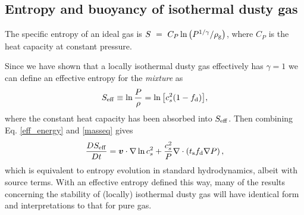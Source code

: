 


\subsection{Entropy and buoyancy of isothermal dusty gas }\label{dusty_entropy}

The specific entropy of an ideal gas is 
$S~=~C_P\ln{\left(P^{1/\gamma}/\rho_\mathrm{g}\right)}$, where $C_P$ is the heat 
capacity at constant pressure. 

Since we have shown that a locally isothermal dusty gas effectively
has $\gamma=1$ we can define an effective 
entropy for the \emph{mixture} as 
\begin{align}
   S_\mathrm{eff} \equiv \ln \frac{P}{\rho} = \ln{\left[c_s^2(1-f_\mathrm{d})\right]},  
\end{align} 
where the constant heat capacity has been absorbed into $S_\mathrm{eff}$. 
Then combining Eq. \ref{eff_energy} and \ref{masseq} gives  
\begin{align*}
  \frac{D S_\mathrm{eff}}{D t} = \bm{v}\cdot\nabla\ln{c_s^2} +
  \frac{c_s^2}{P}\nabla\cdot\left(t_\mathrm{s}f_\mathrm{d}\nabla P\right), 
\end{align*}
which is equivalent to entropy evolution in standard  
hydrodynamics, albeit with source terms. With an effective
entropy defined this way, many of the  
results concerning the stability of (locally) isothermal dusty gas
will have identical form and interpretations to that for pure gas.   

